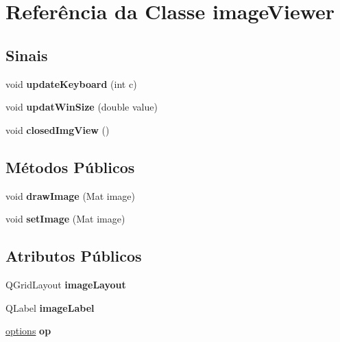 \hypertarget{classimageViewer}{
\section{Referência da Classe imageViewer}
\label{classimageViewer}
}
\subsection*{Sinais}
\begin{DoxyCompactItemize}
\item 
\hypertarget{classimageViewer_a4d18871fbab4e167aa2decf942f5fe1b}{
void {\bfseries updateKeyboard} (int c)}
\label{classimageViewer_a4d18871fbab4e167aa2decf942f5fe1b}

\item 
\hypertarget{classimageViewer_a79add8ded5d97387e9da78e3dc72c9d1}{
void {\bfseries updatWinSize} (double value)}
\label{classimageViewer_a79add8ded5d97387e9da78e3dc72c9d1}

\item 
\hypertarget{classimageViewer_a1ba8b978b417ded69fd5bb4dc9a0734e}{
void {\bfseries closedImgView} ()}
\label{classimageViewer_a1ba8b978b417ded69fd5bb4dc9a0734e}

\end{DoxyCompactItemize}
\subsection*{Métodos Públicos}
\begin{DoxyCompactItemize}
\item 
\hypertarget{classimageViewer_ac8c00c9f17e368cad344aca2ef311d2f}{
void {\bfseries drawImage} (Mat image)}
\label{classimageViewer_ac8c00c9f17e368cad344aca2ef311d2f}

\item 
\hypertarget{classimageViewer_ad0e61a4f5b4beb457964401ef5ad12a0}{
void {\bfseries setImage} (Mat image)}
\label{classimageViewer_ad0e61a4f5b4beb457964401ef5ad12a0}

\end{DoxyCompactItemize}
\subsection*{Atributos Públicos}
\begin{DoxyCompactItemize}
\item 
\hypertarget{classimageViewer_a77b1d347d6909afe154ce307f88d1925}{
QGridLayout {\bfseries imageLayout}}
\label{classimageViewer_a77b1d347d6909afe154ce307f88d1925}

\item 
\hypertarget{classimageViewer_af575ccfa720ae7217af02269aeec72cb}{
QLabel {\bfseries imageLabel}}
\label{classimageViewer_af575ccfa720ae7217af02269aeec72cb}

\item 
\hypertarget{classimageViewer_a42128e897301e2abc44aa53696337c29}{
\hyperlink{classoptions}{options} {\bfseries op}}
\label{classimageViewer_a42128e897301e2abc44aa53696337c29}

\end{DoxyCompactItemize}
